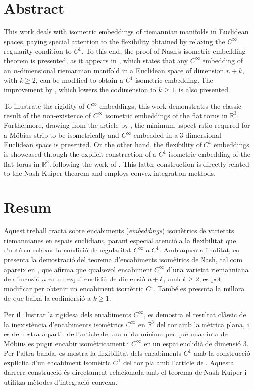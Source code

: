 \documentclass[11pt,a4paper,openright,oneside]{book}
\numberwithin{equation}{section}
\theoremstyle{definition}
\begin{document}
\newpage
{} 

\section*{Abstract}
This work deals with isometric embeddings of riemannian manifolds in Euclidean spaces, paying special attention to the flexibility obtained by relaxing the $C^\infty$ regularity condition to $C^1$. To this end, the proof of Nash's isometric embedding theorem is presented, as it appears in \cite{nash1954}, which states that any $C^\infty$ embedding of an $n$-dimensional riemannian manifold in a Euclidean space of dimension $n+k$, with $k \geq 2$, can be modified to obtain a $C^1$ isometric embedding. The improvement by \cite{kuiper1955}, which lowers the codimension to $k \geq 1$, is also presented.

To illustrate the rigidity of $C^\infty$ embeddings, this work demonstrates the classic result of the non-existence of $C^\infty$ isometric embeddings of the flat torus in $\mathbb R^3$. Furthermore, drawing from the article by \cite{schwartz2024}, the minimum aspect ratio required for a Möbius strip to be isometrically and $C^\infty$ embedded in a 3-dimensional Euclidean space is presented. On the other hand, the flexibility of $C^1$ embeddings is showcased through the explicit construction of a $C^1$ isometric embedding of the flat torus in $\mathbb R^3$, following the work of \cite{borrelli2013}. This latter construction is directly related to the Nash-Kuiper theorem and employs convex integration methods.



\section*{Resum}
Aquest treball tracta sobre encabiments (\textit{embeddings}) isomètrics de varietats riemannianes en espais euclidians, parant especial atenció a la flexibilitat que s'obté en relaxar la condició de regularitat $C^\infty$ a $C^1$. Amb aquesta finalitat, es presenta la demostració del teorema d'encabiments isomètrics de Nash, tal com apareix en \cite{nash1954}, que afirma que qualsevol encabiment $C^\infty$ d'una varietat riemanniana de dimensió $n$ en un espai euclidià de dimensió $n+k$, amb $k \geq 2$, es pot modificar per obtenir un encabiment isomètric $C^1$. També es presenta la millora de \cite{kuiper1955} que baixa la codimensió a $k\ge1$. 

Per il·lustrar la rigidesa dels encabiments $C^\infty$, es demostra el resultat clàssic de la inexistència d'encabiments isomètrics $C^\infty$ en $\mathbb R^3$ del tor amb la mètrica plana, i es demostra a partir de l'article de \cite{schwartz2024} una mida mínima per què una cinta de Möbius es pugui encabir isomètricament i $C^\infty$ en un espai euclidià de dimensió 3. Per l'altra banda, es mostra la flexibilitat dels encabiments $C^1$ amb la construcció explícita d'un encabiment isomètric $C^1$ del tor pla amb l'article de \cite{borrelli2013}. Aquesta darrera construcció és directament relacionada amb el teorema de Nash-Kuiper i utilitza mètodes d'integració convexa.
\end{document}
